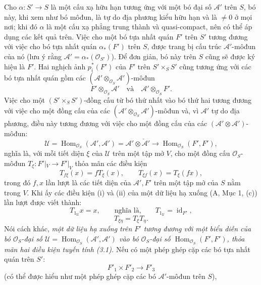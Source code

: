 Cho $\alpha:S'\longrightarrow S$ là một cấu xạ hữu hạn tương ứng với một bó
đại số $\mathcal A'$ trên $S$, bó này, khi xem như bó môđun, là tự do địa phương
kiểu hữu hạn và là $\ne0$ ở mọi nơi; khi đó $\alpha$ là một cấu xạ phẳng trung
thành và quasi-compact, nên có thể áp dụng các kết quả trên. Việc cho một bó
tựa nhất quán $F'$ trên $S'$ tương đương với việc cho bó tựa nhất quán
$\alpha_*(F')$ trên $S$, được trang bị cấu trúc $\mathcal A'$-môđun của nó
(lưu ý rằng $\mathcal A'=\alpha_*(\mathcal O_{S'})$). Để đơn giản, bó này trên
$S$ cũng sẽ được ký hiệu là $F'$. Hai nghịch ảnh $p_i^*(F')$ của $F'$ trên
$S'\times_SS'$ cũng tương ứng với các bó tựa nhất quán gồm các
$(\mathcal A'\otimes_{\mathcal O_S}\mathcal A')$-môđun
\[
  F'\otimes_{\mathcal O_S}\mathcal A'
  \quad\text{và}\quad
  \mathcal A'\otimes_{\mathcal O_S}F'.
\]
Việc cho một $(S'\times_SS')$-đồng cấu từ bó thứ nhất vào bó thứ hai tương
đương với việc cho một đồng cấu của các
$(\mathcal A'\otimes_{\mathcal O_S}\mathcal A')$-môđun và, vì $\mathcal A'$
tự do địa phương, điều này tương đương với việc cho một đồng cấu của các
$(\mathcal A'\otimes\mathcal A')$-môđun:
\[
  \mathcal U=
  \operatorname{Hom}_{\mathcal O_S}(\mathcal A',\mathcal A')
  =\mathcal A'\otimes\check{\mathcal A}'
  \longrightarrow
  \operatorname{Hom}_{\mathcal O_S}(F',F'),
\]
nghĩa là, với mỗi tiết diện $\xi$ của $\mathcal U$ trên một tập mở $V$, cho một
đồng cấu $\mathcal O_S$-môđun
$T_\xi:F'|_V\longrightarrow F'|_V$ thỏa mãn các điều kiện
\begin{equation}
  T_{f\xi}(x)=fT_\xi(x),
  \qquad T_{\xi f}(x)=T_\xi(fx),
  \tag{3.1}
\end{equation}
trong đó $f,x$ lần lượt là các tiết diện của $\mathcal A',F'$ trên một tập mở
của $S$ nằm trong $V$. Khi ấy các điều kiện (i) và (ii) của một dữ liệu hạ xuống
(A, Mục 1, (c)) lần lượt được viết thành:
\begin{equation}
  T_{1_{\mathcal U}}x=x,
  \qquad\text{nghĩa là,}\qquad
  T_{1_{\mathcal U}}=\operatorname{id}_{F'},
  \tag{3.2}
\end{equation}
\begin{equation}
  T_{\xi\eta}=T_\xi T_\eta.
  \tag{3.3}
\end{equation}
Nói cách khác, \emph{một dữ liệu hạ xuống trên $F'$ tương đương với một biểu
diễn của bó $\mathcal O_S$-đại số
$\mathcal U=\operatorname{Hom}_{\mathcal O_S}(\mathcal A',\mathcal A')$ vào
bó $\mathcal O_S$-đại số
$\operatorname{Hom}_{\mathcal O_S}(F',F')$, thỏa mãn hai điều kiện tuyến tính
(3.1).} Nếu có một phép ghép cặp các bó tựa nhất quán trên $S'$:
\[
  F'_1\times F'_2\longrightarrow F'_3
\]
(có thể được hiểu như một phép ghép cặp các bó $\mathcal A'$-môđun trên $S$),


